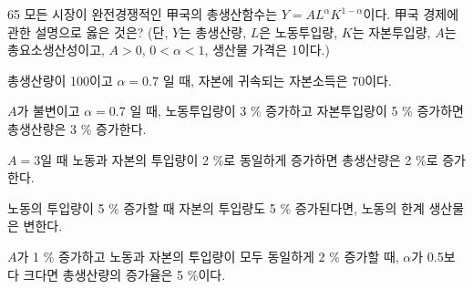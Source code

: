 \begin{question}{65}
모든 시장이 완전경쟁적인 甲국의 총생산함수는 $Y=AL^{\alpha}K^{1-\alpha}$이다. 甲국 경제에 관한 설명으로 옳은 것은? (단, $Y$는 총생산량, $L$은 노동투입량, $K$는 자본투입량, $A$는 총요소생산성이고, $A>0$, $0<\alpha<1$, 생산물 가격은 1이다.)
\begin{choices}
  \item 총생산량이 100이고 $\alpha =0.7$ 일 때, 자본에 귀속되는 자본소득은 70이다.
  \item $A$가 불변이고 $\alpha =0.7$ 일 때, 노동투입량이 3 \% 증가하고 자본투입량이 5 \% 증가하면 총생산량은 3 \% 증가한다.
  \item $A=3$일 때 노동과 자본의 투입량이 2 \%로 동일하게 증가하면 총생산량은 2 \%로 증가한다.
  \item 노동의 투입량이 5 \% 증가할 때 자본의 투입량도 5 \% 증가된다면, 노동의 한계 생산물은 변한다.
  \item $A$가 1 \% 증가하고 노동과 자본의 투입량이 모두 동일하게 2 \% 증가할 때, $\alpha$가 0.5보다 크다면 총생산량의 증가율은 5 \%이다.
\end{choices}
\end{question}
